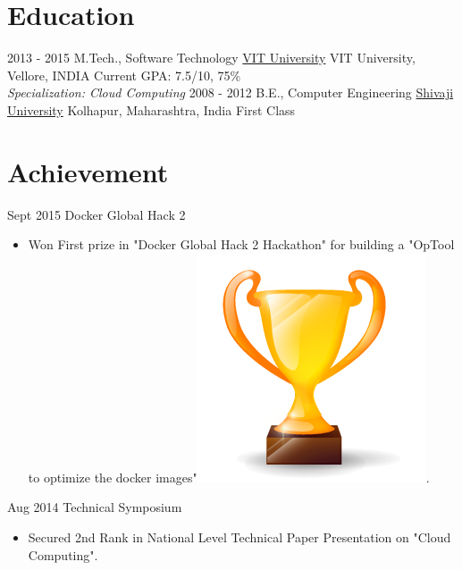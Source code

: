 \documentclass[letterpaper]{twentysecondcv} %
\begin{document}
\makeprofile %

\section{Education}

\begin{twenty} %
	\twentyitem
    	{2013 - 2015 }
        {M.Tech., Software Technology}
        {\href{http://www.vit.ac.in/}{VIT University}}
        { VIT University, Vellore, INDIA}
        {Current GPA: 7.5/10, 75\% \\ \textit{Specialization: Cloud Computing}}
	\twentyitem
    	{2008 - 2012}
        {B.E., Computer Engineering}
        {\href{http://www.unishivaji.ac.in/}{Shivaji University}}
        {Kolhapur, Maharashtra, India}
        {First Class}
\end{twenty}

\section{Achievement}
\begin{twenty}
	\twentyitem
    	{Sept 2015}
        { Docker Global Hack 2 }
        {}
        {}
        {
        {\begin{itemize}
        \item Won First prize in "Docker Global Hack 2 Hackathon" for building a "OpTool to optimize the docker images"{\includegraphics[scale=0.05]{img/trophy.png}}.
    \end{itemize}}
        }
        {}
\end{twenty}
\begin{twenty}
	\twentyitem
    	{Aug 2014}
        { Technical Symposium }
        {}
        {}
        {
        {\begin{itemize}
        \item Secured 2nd Rank in National Level Technical Paper Presentation on "Cloud Computing".
    \end{itemize}}
        }
\end{twenty}
\end{document}

